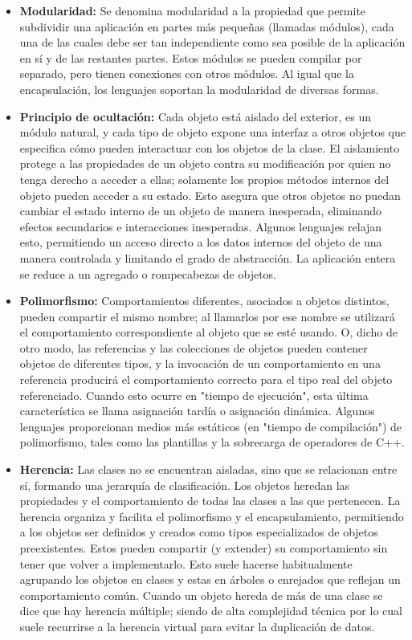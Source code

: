 \documentclass[12pt,a4paper,spanish]{book} %
\begin{document}
\begin{itemize}
\item\textbf{Modularidad:} Se denomina modularidad a la propiedad que permite subdividir una aplicación en partes más pequeñas (llamadas módulos), cada una de las cuales debe ser tan independiente como sea posible de la aplicación en sí y de las restantes partes. Estos módulos se pueden compilar por separado, pero tienen conexiones con otros módulos. Al igual que la encapsulación, los lenguajes soportan la modularidad de diversas formas.
\item\textbf{Principio de ocultación:} Cada objeto está aislado del exterior, es un módulo natural, y cada tipo de objeto expone una interfaz a otros objetos que especifica cómo pueden interactuar con los objetos de la clase. El aislamiento protege a las propiedades de un objeto contra su modificación por quien no tenga derecho a acceder a ellas; solamente los propios métodos internos del objeto pueden acceder a su estado. Esto asegura que otros objetos no puedan cambiar el estado interno de un objeto de manera inesperada, eliminando efectos secundarios e interacciones inesperadas. Algunos lenguajes relajan esto, permitiendo un acceso directo a los datos internos del objeto de una manera controlada y limitando el grado de abstracción. La aplicación entera se reduce a un agregado o rompecabezas de objetos.
\item\textbf{Polimorfismo:} Comportamientos diferentes, asociados a objetos distintos, pueden compartir el mismo nombre; al llamarlos por ese nombre se utilizará el comportamiento correspondiente al objeto que se esté usando. O, dicho de otro modo, las referencias y las colecciones de objetos pueden contener objetos de diferentes tipos, y la invocación de un comportamiento en una referencia producirá el comportamiento correcto para el tipo real del objeto referenciado. Cuando esto ocurre en "tiempo de ejecución", esta última característica se llama asignación tardía o asignación dinámica. Algunos lenguajes proporcionan medios más estáticos (en "tiempo de compilación") de polimorfismo, tales como las plantillas y la sobrecarga de operadores de C++.
\item\textbf{Herencia:} Las clases no se encuentran aisladas, sino que se relacionan entre sí, formando una jerarquía de clasificación. Los objetos heredan las propiedades y el comportamiento de todas las clases a las que pertenecen. La herencia organiza y facilita el polimorfismo y el encapsulamiento, permitiendo a los objetos ser definidos y creados como tipos especializados de objetos preexistentes. Estos pueden compartir (y extender) su comportamiento sin tener que volver a implementarlo. Esto suele hacerse habitualmente agrupando los objetos en clases y estas en árboles o enrejados que reflejan un comportamiento común. Cuando un objeto hereda de más de una clase se dice que hay herencia múltiple; siendo de alta complejidad técnica por lo cual suele recurrirse a la herencia virtual para evitar la duplicación de datos.

\end{itemize}
\end{document}
